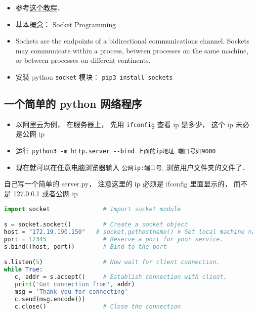 
\begin{itemize}
\item 参考\href{https://www.tutorialspoint.com/python/python_networking.htm}{这个教程}．
\item 基本概念： Socket Programming
\item Sockets are the endpoints of a bidirectional communications channel. Sockets may communicate within a process, between processes on the same machine, or between processes on different continents.
\item 安装 python \verb|socket| 模块： \verb|pip3 install sockets|
\end{itemize}

\subsection{一个简单的 python 网络程序}
\begin{itemize}
\item 以阿里云为例， 在服务器上， 先用 \verb|ifconfig| 查看 ip 是多少， 这个 ip 未必是公网 ip
\item 运行 \verb|python3 -m http.server --bind 上面的ip地址 端口号如9000|
\item 现在就可以在任意电脑浏览器输入 \verb|公网ip:端口号|, 浏览用户文件夹的文件了．
\end{itemize}

自己写一个简单的 server.py， 注意这里的 ip 必须是 ifconfig 里面显示的， 而不是 127.0.0.1 或者公网 ip
\begin{lstlisting}[language=python]
import socket               # Import socket module

s = socket.socket()         # Create a socket object
host = "172.19.190.150"   # socket.gethostname() # Get local machine name
port = 12345                # Reserve a port for your service.
s.bind((host, port))        # Bind to the port

s.listen(5)                 # Now wait for client connection.
while True:
   c, addr = s.accept()     # Establish connection with client.
   print('Got connection from', addr)
   msg = 'Thank you for connecting'
   c.send(msg.encode())
   c.close()                # Close the connection
\end{lstlisting}
